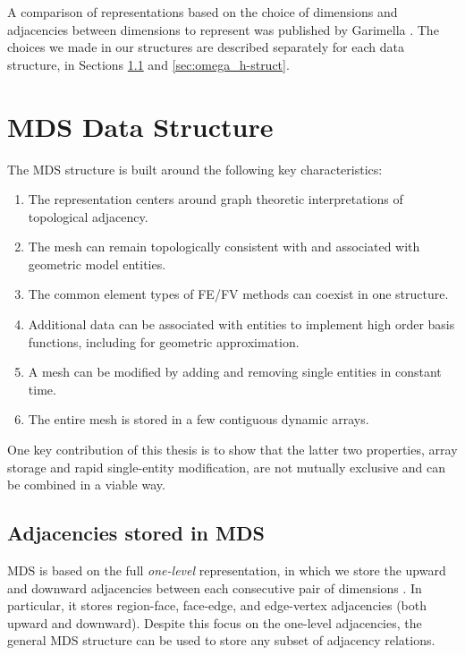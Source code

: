 A comparison of representations based on the choice
of dimensions and adjacencies between
dimensions to represent
was published by Garimella \cite{garimella2002mesh}.
The choices we made in our structures are described separately
for each data structure,
in Sections \ref{sec:mds_adj} and \ref{sec:omega_h-struct}.

\section{MDS Data Structure}
\label{sec:sisc}

The MDS structure is built around the following key characteristics:

\begin{enumerate}
\item The representation centers around graph theoretic interpretations
of topological adjacency.
\item The mesh can remain topologically consistent with and associated with
geometric model entities.
\item The common element types of FE/FV methods can coexist in one structure.
\item Additional data can be associated with entities to implement
high order basis functions, including for geometric approximation.
\item A mesh can be modified by adding and removing single entities in constant time.
\item The entire mesh is stored in a few contiguous dynamic arrays.
\end{enumerate}

One key contribution of this thesis is to show that the latter two properties,
array storage and rapid single-entity modification, are not mutually exclusive
and can be combined in a viable way.

\subsection{Adjacencies stored in MDS}
\label{sec:mds_adj}

MDS is based on the full {\it one-level} representation,
in which we store the upward
and downward adjacencies between each consecutive
pair of dimensions \cite{beall1997general}.
In particular, it stores
region-face, face-edge, and edge-vertex adjacencies
(both upward and downward).
Despite this focus on the one-level adjacencies, the general MDS
structure can be used to store any subset of
adjacency relations.

